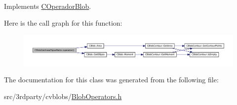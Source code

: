 Implements \hyperlink{class_c_operador_blob_a303c4189cc94cafbcbee116bf014e623}{COperadorBlob}.



Here is the call graph for this function:
\nopagebreak
\begin{figure}[H]
\begin{center}
\leavevmode
\includegraphics[width=400pt]{class_c_blob_get_area_elipse_ratio_a24f9703155af6e963a1ae226cdb71125_cgraph}
\end{center}
\end{figure}




The documentation for this class was generated from the following file:\begin{DoxyCompactItemize}
\item 
src/3rdparty/cvblobs/\hyperlink{_blob_operators_8h}{BlobOperators.h}\end{DoxyCompactItemize}
